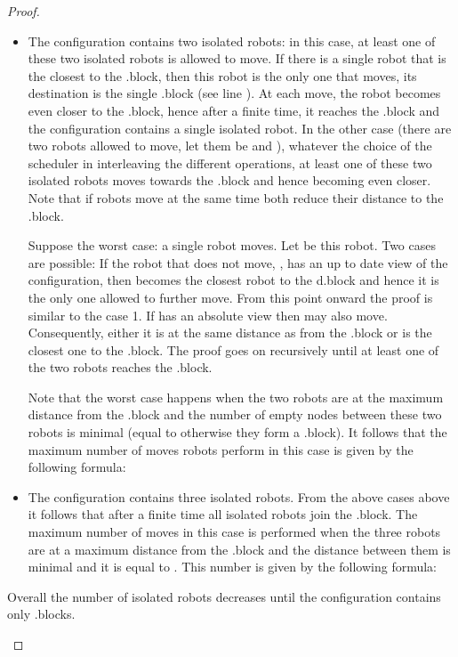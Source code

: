 \documentclass[12pt]{llncs}
\begin{document}
\begin{proof}
\begin{enumerate}
\begin{itemize}
\item{The configuration contains two isolated robots: in this case, at least one of these two isolated robots is allowed to move. If there is a single robot that is the closest to the .block, then this robot is the only one that moves, its destination is the single .block (see line ). At each move, the robot becomes even closer to the .block, hence after a finite time, it reaches the .block and the configuration contains a single isolated robot. In the other case (there are two robots allowed to move, let them be  and ), whatever the choice of the scheduler in interleaving the different operations, at least one of these two isolated robots moves towards the .block and hence becoming even closer. Note that if robots move at the same time both reduce their distance to the .block. 

Suppose the worst case: a single robot moves. Let  be this robot. Two cases are possible: If the robot that does not move, , has an up to date  view of the configuration, then  becomes the closest robot to the d.block and hence it is the only one allowed to further move. From this point onward the proof is similar to the case 1. If  has an absolute view then  may also move. Consequently, either it is at the same distance as  from the .block or  is the closest one to the .block. The proof goes on recursively until at least one of the two robots reaches the .block. 


Note that the worst case happens when the two robots are at the maximum distance from the .block and the number of empty nodes between these two robots is minimal (equal to  otherwise they form a .block). It follows that the maximum number of moves robots perform in this case  is given by the following formula: 
}
\item{The configuration contains three isolated robots. From the above cases above it follows that after a finite time all isolated robots join the .block. The maximum number of moves in this case is performed when the three robots are at a maximum distance from the .block and the distance between them is minimal and it is equal to . This number is given by the following formula: 

}
\end{itemize}
Overall the number of isolated robots decreases until the configuration contains only .blocks.


\end{enumerate}
\end{proof}
\end{document}
